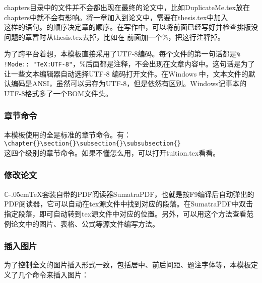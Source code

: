chapters目录中的文件并不会都出现在最终的论文中，比如DuplicateMe.tex放在chapters中就不会有影响。将一章加入到论文中，需要在thesis.tex中加入\\
\verb||这样的语句。\verb||的顺序决定章的顺序。在写作中，可以将前面已经写好并检查排版没问题的章暂时从thesis.tex去掉，比如在\verb|| 前面加一个\%，把这行注释掉。

为了跨平台着想，本模板直接采用了UTF-8编码。每个文件的第一句话都是\verb|% !Mode:: "TeX:UTF-8"|，\%后面都是注释，不会出现在文章内容中。这句话是为了让一些文本编辑器自动选择UTF-8 编码打开文件。在Windows 中，文本文件的默认编码是ANSI，虽然可以另存为UTF-8，但是依然有区别。Windows记事本的UTF-8格式多了一个BOM文件头。

\subsubsection{章节命令}
本模板使用的全是标准的章节命令。有：\\
\verb|\chapter{}\section{}\subsection{}\subsubsection{}|\\
这四个级别的章节命令。如果不懂怎么用，可以打开tuition.tex看看。

\subsubsection{修改论文}
$\mathbb{C}$\kern-.05em\TeX{}套装自带的PDF阅读器SumatraPDF，也就是按F9编译后自动弹出的PDF阅读器，它可以自动在tex源文件中找到对应的段落。在SumatraPDF中双击指定段落，即可自动转到tex源文件中对应的位置。另外，可以用这个方法查看范例论文中的图片、表格、公式等源文件编写方法。
\subsubsection{插入图片}
为了控制全文的图片插入形式一致，包括居中、前后间距、题注字体等，本模板定义了几个命令来插入图片：

